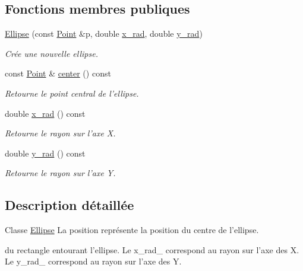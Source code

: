 \subsection*{Fonctions membres publiques}
\begin{DoxyCompactItemize}
\item 
\hyperlink{classEllipse_ad24260e249e5a78b67a779826e8e75d6}{Ellipse} (const \hyperlink{classPoint}{Point} \&p, double \hyperlink{classEllipse_a717ec722ed3528386b610b5ef6d560af}{x\+\_\+rad}, double \hyperlink{classEllipse_affc33b7f55133f772c94c8ae890fb5a0}{y\+\_\+rad})
\begin{DoxyCompactList}\small\item\em Crée une nouvelle ellipse. \end{DoxyCompactList}\item 
const \hyperlink{classPoint}{Point} \& \hyperlink{classEllipse_aab7c65b75ef01d20ec48f1e2b9308ebf}{center} () const 
\begin{DoxyCompactList}\small\item\em Retourne le point central de l'ellipse. \end{DoxyCompactList}\item 
double \hyperlink{classEllipse_a717ec722ed3528386b610b5ef6d560af}{x\+\_\+rad} () const 
\begin{DoxyCompactList}\small\item\em Retourne le rayon sur l'axe X. \end{DoxyCompactList}\item 
double \hyperlink{classEllipse_affc33b7f55133f772c94c8ae890fb5a0}{y\+\_\+rad} () const 
\begin{DoxyCompactList}\small\item\em Retourne le rayon sur l'axe Y. \end{DoxyCompactList}\end{DoxyCompactItemize}


\subsection{Description détaillée}
Classe \hyperlink{classEllipse}{Ellipse} La position représente la position du centre de l'ellipse. 

du rectangle entourant l'ellipse. Le x\+\_\+rad\+\_\+ correspond au rayon sur l'axe des X. Le y\+\_\+rad\+\_\+ correspond au rayon sur l'axe des Y. 

